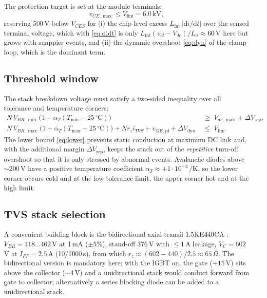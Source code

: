 \documentclass[11pt,a4paper]{article}
\newcommand{\ud}{\mathrm{d}}
\begin{document}
The protection target is set at the module terminals:
%
\begin{equation}
  v_{CE,\max} \le V_{\mathrm{lim}} = 6.0\,\mathrm{kV},
\end{equation}
%
reserving 500\,V below $V_{CES}$ for (i) the chip-level excess
$L_{\mathrm{int}}\,|\ud i/\ud t|$ over the sensed terminal voltage,
which with \eqref{eq:didt} is only
$L_{\mathrm{int}}(v_{cl}-V_{dc})/L_\sigma \approx 60$\,V here but grows
with snappier events, and (ii) the dynamic overshoot \eqref{eq:dyn} of
the clamp loop, which is the dominant term.

\subsection{Threshold window}

The stack breakdown voltage must satisfy a two-sided inequality over
all tolerance and temperature corners:
%
\begin{align}
  N\,V_{BR,\min}\,\bigl(1+\alpha_T (T_{\min}-25\,^\circ\mathrm{C})\bigr)
     &\;\ge\; V_{dc,\max} + \Delta V_{\mathrm{rep}} ,
  \label{eq:lower}\\[2pt]
  N\,V_{BR,\max}\,\bigl(1+\alpha_T (T_{\max}-25\,^\circ\mathrm{C})\bigr)
  + N r_z i_{TVS} + v_{GE,\mathrm{pl}} + \Delta V_{\mathrm{dyn}}
     &\;\le\; V_{\mathrm{lim}} .
  \label{eq:upper}
\end{align}
%
The lower bound \eqref{eq:lower} prevents static conduction at maximum
DC link and, with the additional margin $\Delta V_{\mathrm{rep}}$,
keeps the stack out of the \emph{repetitive} turn-off overshoot so that
it is only stressed by abnormal events. Avalanche diodes above
$\sim$200\,V have a positive temperature coefficient
$\alpha_T \approx +1\cdot 10^{-3}\,/$K, so the lower corner occurs
cold and at the low tolerance limit, the upper corner hot and at the
high limit.

\subsection{TVS stack selection}

A convenient building block is the bidirectional axial transil
1.5KE440CA \cite{tvsds}: $V_{BR} = 418\ldots462$\,V at 1\,mA
($\pm5\%$), stand-off 376\,V with $\le 1$\,\textmu A leakage,
$V_C = 602$\,V at $I_{PP}=2.5$\,A (10/1000\,\textmu s), from which
$r_z \approx (602-440)/2.5 \approx 65\,\Omega$. The bidirectional
version is mandatory here: with the IGBT on, the gate ($+15$\,V) sits
above the collector ($\sim$4\,V) and a unidirectional stack would
conduct forward from gate to collector; alternatively a series blocking
diode can be added to a unidirectional stack.
\end{document}
